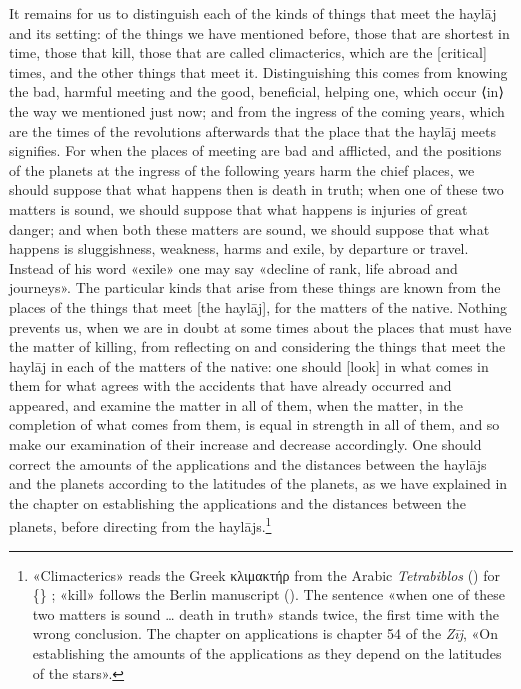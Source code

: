 \documentclass[11pt]{article}
\newcommand{\Fol}[1]{\marginpar{\footnotesize\color{gray}f.\,#1}}
\begin{document}
\par \Fol{49r}It remains for us to distinguish each of the kinds of things that meet the haylāj and its setting: of the things we have mentioned before, those that are shortest in time, those that kill, those that are called climacterics, which are the [critical] times, and the other things that meet it. Distinguishing this comes from knowing the bad, harmful meeting and the good, beneficial, helping one, which occur {\mdseries ⟨}in{\mdseries ⟩} the way we mentioned just now; and from the ingress of the coming years, which are the times of the revolutions afterwards that the place that the haylāj meets signifies. For when the places of meeting are bad and afflicted, and the positions of the planets at the ingress of the following years harm the chief places, we should suppose that what happens then is death in truth; when one of these two matters is sound, we should suppose that what happens is injuries of great danger; and when both these matters are sound, we should suppose that what happens is sluggishness, weakness, harms and exile, by departure or travel. Instead of his word «exile» one may say «decline of rank, life abroad and journeys». The particular kinds that arise from these things are known from the places of the things that meet [the haylāj], for the matters of the native. Nothing prevents us, when we are in doubt at some times about the places that must have the matter of killing, from reflecting on and considering the things that meet the haylāj in each of the matters of the native: one should [look] in what comes in them for what agrees with the accidents that have already occurred and appeared, and examine the matter in all of them, when the matter, in the completion of what comes from them, is equal in strength in all of them, and so make our examination of their increase and decrease accordingly. One should correct the amounts of the applications and the distances between the haylājs and the planets according to the latitudes of the planets, as we have explained in the chapter on establishing the applications and the distances between the planets, before directing from the haylājs.\footnote{«Climacterics» reads the Greek κλιμακτήρ from the Arabic \emph{Tetrabiblos} () for \{\} ; «kill» follows the Berlin manuscript (). The sentence «when one of these two matters is sound … death in truth» stands twice, the first time with the wrong conclusion. The chapter on applications is chapter 54 of the \emph{Zīj}, «On establishing the amounts of the applications as they depend on the latitudes of the stars».}\par
\end{document}
